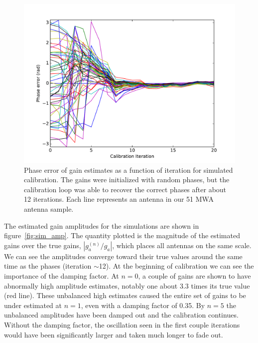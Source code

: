 \documentclass[a4paper,fleqn,usenatbib]{mnras}
\begin{document}
\begin{figure}
\begin{center}
\includegraphics[width=\columnwidth]{fig3.pdf}
\caption{Phase error of gain estimates as a function of iteration for simulated calibration. The 
gains were initialized with random phases, but the calibration loop was able to recover the 
correct phases after about 12 iterations. Each line represents an antenna in our 51 MWA 
antenna sample.
}
\label{fig:sim_phase}
\end{center}
\end{figure}

The estimated gain amplitudes for the simulations are shown in figure~\ref{fig:sim_amp}. The 
quantity plotted is the magnitude of the estimated gains over the true gains, $\left|g^{(n)}_a/
g_a\right|$, which places all antennas on the same scale. We can see the amplitudes 
converge toward their true values around the same time as the phases (iteration $\sim$12). At 
the beginning of calibration we can see the importance of the damping factor. At $n=0$, a couple of 
gains are shown to have abnormally high amplitude estimates, notably one about 3.3 times its 
true value (red line). These unbalanced high estimates caused the entire set of gains to be 
under estimated at $n=1$, even with a damping factor of 0.35. By $n=5$ the unbalanced 
amplitudes have been damped out and the calibration continues. Without the damping factor, 
the oscillation seen in the first couple iterations would have been significantly larger and taken 
much longer to fade out. 
\end{document}
